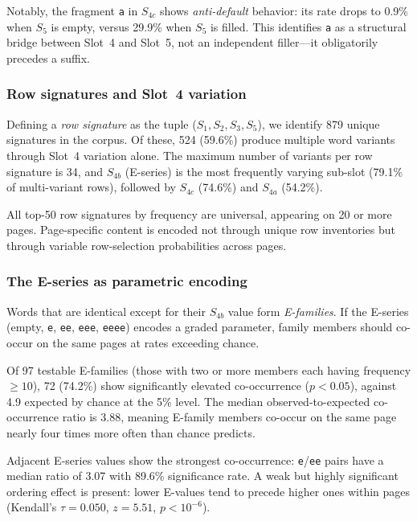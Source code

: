 \documentclass[12pt]{article}
\begin{document}
Notably, the fragment \texttt{a} in $S_{4c}$ shows \emph{anti-default} behavior: its rate drops to 0.9\% when $S_5$ is empty, versus 29.9\% when $S_5$ is filled. This identifies \texttt{a} as a structural bridge between Slot~4 and Slot~5, not an independent filler---it obligatorily precedes a suffix.

\subsubsection{Row signatures and Slot~4 variation}

Defining a \emph{row signature} as the tuple ($S_1, S_2, S_3, S_5$), we identify 879 unique signatures in the corpus. Of these, 524 (59.6\%) produce multiple word variants through Slot~4 variation alone. The maximum number of variants per row signature is 34, and $S_{4b}$ (E-series) is the most frequently varying sub-slot (79.1\% of multi-variant rows), followed by $S_{4c}$ (74.6\%) and $S_{4a}$ (54.2\%).

All top-50 row signatures by frequency are universal, appearing on 20 or more pages. Page-specific content is encoded not through unique row inventories but through variable row-selection probabilities across pages.

\subsubsection{The E-series as parametric encoding}

Words that are identical except for their $S_{4b}$ value form \emph{E-families}. If the E-series (empty, \texttt{e}, \texttt{ee}, \texttt{eee}, \texttt{eeee}) encodes a graded parameter, family members should co-occur on the same pages at rates exceeding chance.

Of 97 testable E-families (those with two or more members each having frequency $\geq 10$), 72 (74.2\%) show significantly elevated co-occurrence ($p < 0.05$), against 4.9 expected by chance at the 5\% level. The median observed-to-expected co-occurrence ratio is 3.88, meaning E-family members co-occur on the same page nearly four times more often than chance predicts.

Adjacent E-series values show the strongest co-occurrence: \texttt{e}/\texttt{ee} pairs have a median ratio of 3.07 with 89.6\% significance rate. A weak but highly significant ordering effect is present: lower E-values tend to precede higher ones within pages (Kendall's $\tau = 0.050$, $z = 5.51$, $p < 10^{-6}$).
\end{document}
